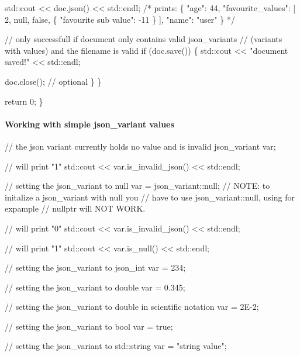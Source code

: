 \begin{DoxyCode}
        std::cout << doc.json() << std::endl;
        \textcolor{comment}{/*}
\textcolor{comment}{        prints:}
\textcolor{comment}{        \{}
\textcolor{comment}{            "age": 44,}
\textcolor{comment}{            "favourite\_values": [}
\textcolor{comment}{                2,}
\textcolor{comment}{                null,}
\textcolor{comment}{                false,}
\textcolor{comment}{                \{}
\textcolor{comment}{                    "favourite sub value": -11}
\textcolor{comment}{                \}}
\textcolor{comment}{            ],}
\textcolor{comment}{            "name": "user"}
\textcolor{comment}{        \}}
\textcolor{comment}{        */}

        \textcolor{comment}{// only successfull if document only contains valid json\_variants}
        \textcolor{comment}{// (variants with values) and the filename is valid}
        \textcolor{keywordflow}{if} (doc.save()) \{ 
            std::cout << \textcolor{stringliteral}{"document saved!"} << std::endl;

            doc.close(); \textcolor{comment}{// optional}
        \}
    \}

    \textcolor{keywordflow}{return} 0;
\}
\end{DoxyCode}


\paragraph*{\label{_working_with_simple_section}%
Working with simple json\+\_\+variant values}


\begin{DoxyCode}
\textcolor{comment}{// the json variant currently holds no value and is invalid}
json\_variant var;

\textcolor{comment}{// will print "1"}
std::cout << var.is\_invalid\_json() << std::endl;    

\textcolor{comment}{// setting the json\_variant to null}
var = json\_variant::null;
\textcolor{comment}{// NOTE: to initalize a json\_variant with null you }
\textcolor{comment}{// have to use json\_variant::null, using for expample }
\textcolor{comment}{// nullptr will NOT WORK.}

\textcolor{comment}{// will print "0"}
std::cout << var.is\_invalid\_json() << std::endl;

\textcolor{comment}{// will print "1"}
std::cout << var.is\_null() << std::endl;

\textcolor{comment}{// setting the json\_variant to json\_int}
var = 234;

\textcolor{comment}{// setting the json\_variant to double}
var = 0.345;

\textcolor{comment}{// setting the json\_variant to double in scientific notation}
var = 2E-2;

\textcolor{comment}{// setting the json\_variant to bool}
var = \textcolor{keyword}{true};

\textcolor{comment}{// setting the json\_variant to std::string}
var = \textcolor{stringliteral}{"string value"};       
\end{DoxyCode}


